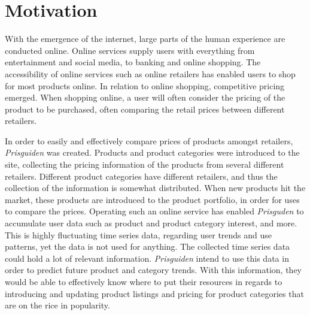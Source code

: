 \section{Motivation}
\label{section:BT:Motivation}

With the emergence of the internet, large parts of the human experience are conducted online.
Online services supply users with everything from entertainment and social media, to banking and online shopping.
The accessibility of online services such as online retailers has enabled users to shop for most products online.
In relation to online shopping, competitive pricing emerged.
When shopping online, a user will often consider the pricing of the product to be purchased, often comparing the retail prices between different retailers.


In order to easily and effectively compare prices of products amongst retailers, 
\textit{Prisguiden} was created.
Products and product categories were introduced to the site, collecting the pricing information of the products from several different retailers.
Different product categories have different retailers, and thus the collection of the information is somewhat distributed.
When new products hit the market, these products are introduced to the product portfolio, in order for uses to compare the prices.
Operating such an online service has enabled \textit{Prisguden} to accumulate user data such as product and product category interest, and more.
This is highly fluctuating time series data, regarding user trends and use patterns, yet the data is not used for anything.
The collected time series data could hold a lot of relevant information.
\textit{Prisguiden} intend to use this data in order to predict future product and category trends.
With this information, they would be able to effectively know where to put their resources in regards to introducing and updating product listings and pricing for product categories 
that are on the rice in popularity.
\linebreak




